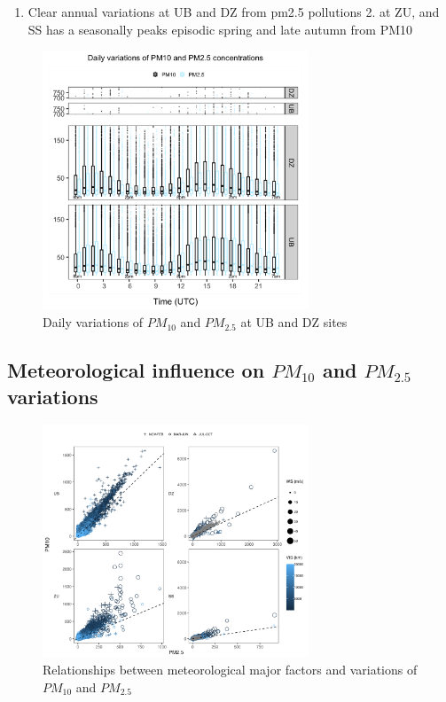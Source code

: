 \documentclass[
  11pt,
]{article}
\providecommand{\tightlist}{%
  \setlength{\itemsep}{0pt}\setlength{\parskip}{0pt}}
\begin{document}
\begin{enumerate}
\def\labelenumi{\arabic{enumi}.}
\tightlist
\item
  Clear annual variations at UB and DZ from pm2.5 pollutions 2. at ZU,
  and SS has a seasonally peaks episodic spring and late autumn from
  PM10
\end{enumerate}

\newpage

\begin{figure}
\centering
\includegraphics[width=3.125in,height=\textheight]{images/figure_5.png}
\caption{Daily variations of \(PM_{10}\) and \(PM_{2.5}\) at UB and DZ
sites}
\end{figure}

\newpage
\subsection{Meteorological influence on $PM_{10}$ and $PM_{2.5}$ variations}
\label{subsec2}

\begin{figure}
\centering
\includegraphics[width=3.125in,height=\textheight]{images/figure_6.png}
\caption{Relationships between meteorological major factors and
variations of \(PM_{10}\) and \(PM_{2.5}\)}
\end{figure}
\end{document}
